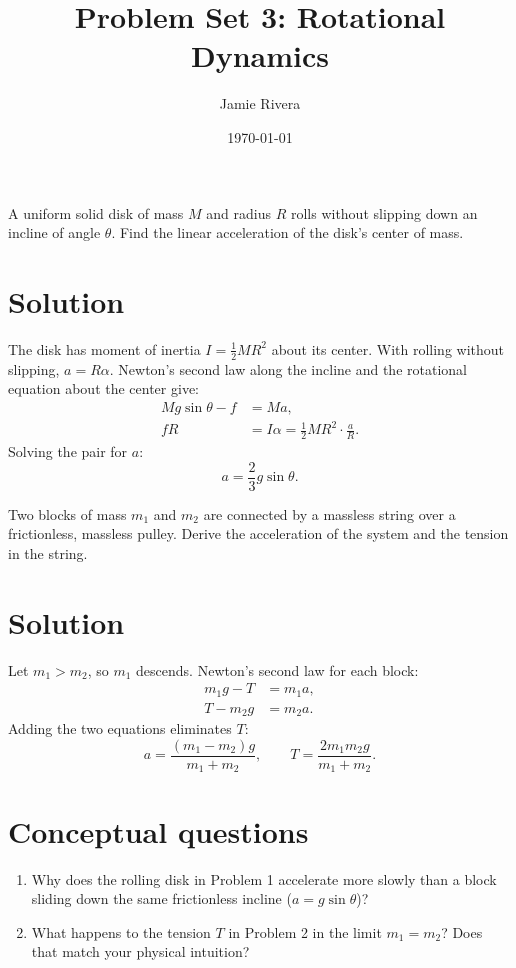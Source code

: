 \documentclass{fphw}
\title{Problem Set 3: Rotational Dynamics}
\author{Jamie Rivera}
\institute{Department of Physics}
\date{\today}
\begin{document}
\maketitle

\begin{problem}
A uniform solid disk of mass $M$ and radius $R$ rolls without slipping down
an incline of angle $\theta$. Find the linear acceleration of the disk's
center of mass.
\end{problem}

\section*{Solution}

The disk has moment of inertia $I = \tfrac{1}{2}MR^2$ about its center. With
rolling without slipping, $a = R\alpha$. Newton's second law along the
incline and the rotational equation about the center give:
\begin{align*}
	Mg\sin\theta - f &= Ma, \\
	fR &= I\alpha = \tfrac{1}{2}MR^2 \cdot \frac{a}{R}.
\end{align*}
Solving the pair for $a$:
\[
	a = \frac{2}{3}g\sin\theta.
\]

\begin{problem}
Two blocks of mass $m_1$ and $m_2$ are connected by a massless string over a
frictionless, massless pulley. Derive the acceleration of the system and the
tension in the string.
\end{problem}

\section*{Solution}

Let $m_1 > m_2$, so $m_1$ descends. Newton's second law for each block:
\begin{align*}
	m_1 g - T &= m_1 a, \\
	T - m_2 g &= m_2 a.
\end{align*}
Adding the two equations eliminates $T$:
\[
	a = \frac{(m_1 - m_2)g}{m_1 + m_2}, \qquad
	T = \frac{2 m_1 m_2 g}{m_1 + m_2}.
\]

\section{Conceptual questions}

\begin{enumerate}
	\item Why does the rolling disk in Problem 1 accelerate more slowly than
	a block sliding down the same frictionless incline ($a = g\sin\theta$)?
	\item What happens to the tension $T$ in Problem 2 in the limit
	$m_1 = m_2$? Does that match your physical intuition?
\end{enumerate}
\end{document}
